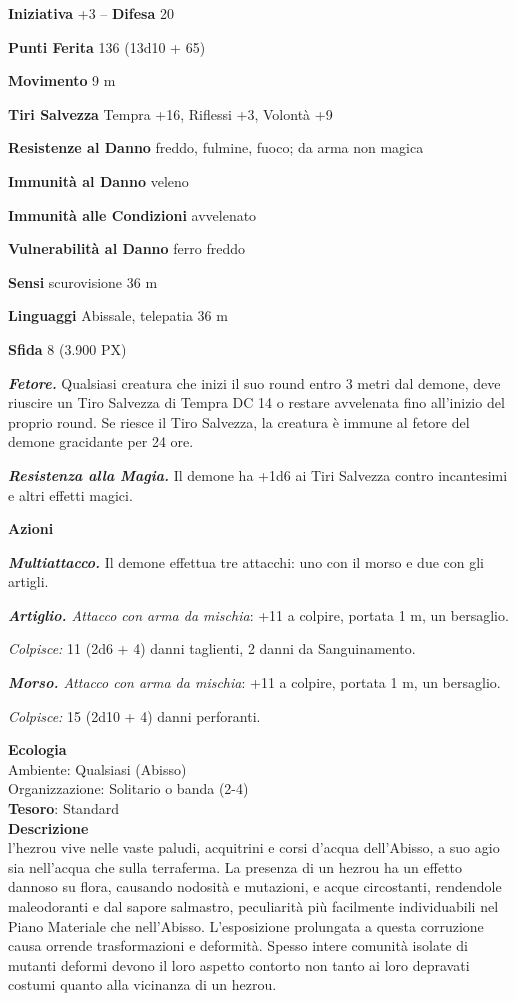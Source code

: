 \begin{multicols}{2}
	\textbf{Iniziativa} +3 -- \textbf{Difesa} 20

	\textbf{Punti Ferita} 136 (13d10 + 65)

	\textbf{Movimento} 9 m

	\textbf{Tiri Salvezza} Tempra +16, Riflessi +3, Volontà +9

	\textbf{Resistenze al Danno} freddo, fulmine, fuoco; da arma non magica

	\textbf{Immunità al Danno} veleno

	\textbf{Immunità alle Condizioni} avvelenato

	\textbf{Vulnerabilità al Danno} ferro freddo

	\textbf{Sensi} scurovisione 36 m

	\textbf{Linguaggi} Abissale, telepatia 36 m

	\textbf{Sfida} 8 (3.900 PX)

	\textit{\textbf{Fetore.}} Qualsiasi creatura che inizi il suo round entro 3 metri dal demone, deve riuscire un Tiro Salvezza di Tempra DC 14 o restare avvelenata fino all'inizio del proprio round. Se riesce il Tiro Salvezza, la creatura è immune al fetore del demone gracidante per 24 ore.

	\textit{\textbf{Resistenza alla Magia.}} Il demone ha +1d6 ai Tiri Salvezza contro incantesimi e altri effetti magici.

	\textbf{Azioni}

	\textit{\textbf{Multiattacco.}} Il demone effettua tre attacchi: uno con il morso e due con gli artigli.

	\textit{\textbf{Artiglio.} Attacco con arma da mischia}: +11 a colpire, portata 1 m, un bersaglio.

	\textit{Colpisce:} 11 (2d6 + 4) danni taglienti, 2 danni da Sanguinamento.

	\textit{\textbf{Morso.} Attacco con arma da mischia}: +11 a colpire, portata 1 m, un bersaglio.

	\textit{Colpisce:} 15 (2d10 + 4) danni perforanti.

	\textbf{Ecologia}\\
	Ambiente: Qualsiasi (Abisso)\\
	Organizzazione: Solitario o banda (2-4)\\
	\textbf{Tesoro}: Standard\\
	\textbf{Descrizione}\\
	l'hezrou vive nelle vaste paludi, acquitrini e corsi d'acqua dell'Abisso, a suo agio sia nell'acqua che sulla terraferma. La presenza di un hezrou ha un effetto dannoso su flora, causando nodosità e mutazioni, e acque circostanti, rendendole maleodoranti e dal sapore salmastro, peculiarità più facilmente individuabili nel Piano Materiale che nell'Abisso. L'esposizione prolungata a questa corruzione causa orrende trasformazioni e deformità. Spesso intere comunità isolate di mutanti deformi devono il loro aspetto contorto non tanto ai loro depravati costumi quanto alla vicinanza di un hezrou.


\end{multicols}
